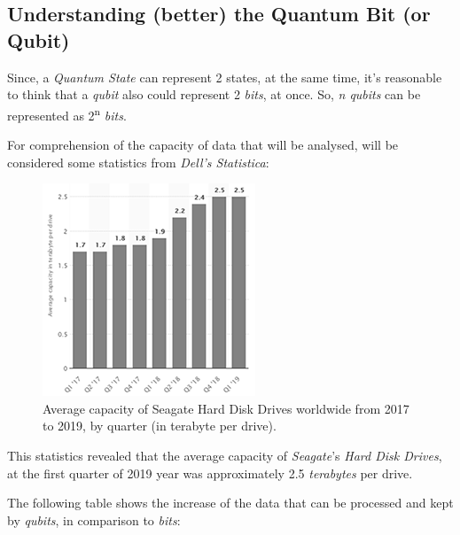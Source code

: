 \documentclass[conference]{IEEEtran}
\begin{document}
\newpage

\subsection{Understanding (better) the Quantum Bit (or Qubit)}\label{AA}

\vspace{4pt}

Since, a \textit{Quantum State} can represent 2 states, at the same time, it's reasonable to think that a \textit{qubit} also could represent 2 \textit{bits}, at once. So, \textit{n qubits} can be represented as 2\textsuperscript{n} \textit{bits}.

\vspace{4pt}

For comprehension of the capacity of data that will be analysed, will be considered some statistics from \textit{Dell's Statistica}:

\begin{figure}[htbp]
\centerline{\includegraphics{imgs/fig-9.png}}
\caption{Average capacity of Seagate Hard Disk Drives worldwide from 2017 to 2019, by quarter (in terabyte per drive).}
\label{fig}
\end{figure}

This statistics revealed that the average capacity of \textit{Seagate}'s \textit{Hard Disk Drives}, at the first quarter of 2019 year was approximately 2.5 \textit{terabytes} per drive.

\vspace{4pt}

The following table shows the increase of the data that can be processed and kept by \textit{qubits}, in comparison to \textit{bits}:
\end{document}
